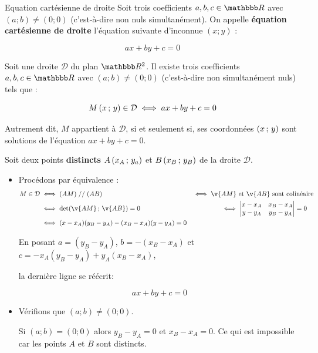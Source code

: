 \documentclass[10pt,a4paper,openany,twoside, prof]{book}
\begin{document}
\begin{defi}{Equation cartésienne de droite}{}
   Soit trois coefficients $a,b,c\in\R$ avec $(a;b)\ne (0;0)$ (c'est-à-dire non nuls simultanément). On appelle \textbf{équation cartésienne de droite} l'équation suivante d'inconnue $(x;y)$ :

   $$ax+by+c=0$$
\end{defi}

\begin{prop}{}{}
	Soit une droite $\mathcal{D}$ du plan $\R^2$. Il existe trois coefficients $a,b,c\in\R$ avec $(a;b)\ne (0;0)$ (c'est-à-dire non simultanément nuls) tels que :

   $$M\left(x\,;\,y\right)\in\mathcal{D} \iff ax+by+c=0$$

   Autrement dit, $M$ appartient à $\mathcal{D}$, si et seulement si, ses coordonnées $\left(x\,;\,y\right)$ sont solutions de l'équation $ax+by+c=0$.
\end{prop}

\begin{deme}{}{}
   \begin{reponse}
   Soit deux points \textbf{distincts} $A\left(x_A\,;\,y_a\right)$ et $B\left(x_B\,;\,y_B\right)$ de la droite $\mathcal{D}$.

   \begin{itemize}
      \item
   Procédons par équivalence :
   \begin{align*}
      M\in\mathcal{D}
      &\iff (AM)\; // \; (AB)
      &\iff \v{AM} \text{ et } \v{AB} \text{ sont colinéaire} &\\
      &\iff \det{\v{AM}}{\v{AB}} = 0
      &\iff \Det{x-x_A & x_B-x_A \\ y-y_A & y_B-y_A} = 0 \quad&\\
      &\iff (x-x_A)(y_B-y_A) - (x_B-x_A)(y-y_A) = 0
   \end{align*}

   En posant $a=(y_B-y_A)$, $b=-(x_B-x_A)$ et $c=-x_A(y_B-y_A)+y_A(x_B-x_A)$,

   la dernière ligne se réécrit:

   $$ax+by+c=0$$

   \item Vérifions que $(a;b)\ne(0;0)$.

   Si $(a;b)=(0;0)$ alors $y_B-y_A=0$ et $x_B-x_A=0$. Ce qui est impossible car les points $A$ et $B$ sont distincts.
\end{itemize}
   \end{reponse}
\end{deme}
\end{document}
